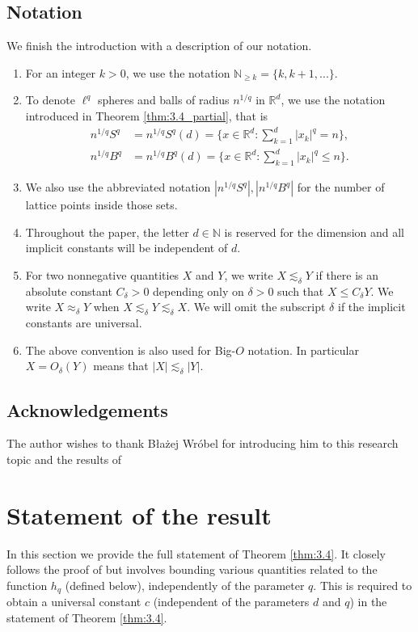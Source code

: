 \documentclass[a4paper,twoside, reqno]{amsart}
\numberwithin{equation}{section}
\theoremstyle{definition}%
\theoremstyle{definition}
\theoremstyle{definition}%
\theoremstyle{definition}
\newcommand{\N}{\mathbb{N}}
\newcommand{\R}{\mathbb{R}}
\begin{document}
\subsection{Notation}
\label{ssec:not}
We finish the introduction with a description of our notation. 

\begin{enumerate}
\item For an integer $k>0$, we use the notation $\N_{\geq k}= \{k,k+1,... \}$.
\item To denote $\ell^q$ spheres and balls of radius $n^{1/q}$ in $\R^d$, we use the notation introduced in Theorem \ref{thm:3.4_partial}, that is
\begin{align*}
n^{1/q}S^q &= n^{1/q}S^q(d) = \{x\in\R^d : \sum_{k=1}^d |x_k|^q = n\}, \\
n^{1/q}B^q &= n^{1/q}B^q(d) = \{x\in\R^d : \sum_{k=1}^d |x_k|^q \leq n\}.
\end{align*}
 \item We also use the abbreviated notation $|n^{1/q}S^q|, |n^{1/q}B^q|$ for the number of lattice points inside those sets.
\item Throughout the paper, the letter $d\in \N$ is reserved for the dimension and all implicit constants will be
independent of $d$.  
\item For two nonnegative quantities $X$ and $Y$,
we write $X \lesssim_{\delta} Y$ if there is an absolute constant
$C_{\delta}>0$ depending only on $\delta>0$ such that $X\le C_{\delta}Y$.
We  write $X \approx_{\delta} Y$ when
$X \lesssim_{\delta} Y\lesssim_{\delta} X$. We will omit the subscript
$\delta$ if the implicit constants are universal.
\item The above convention is also used for Big-$O$ notation. In particular $X=O_{\delta}(Y)$ means that $|X|\lesssim_{\delta} |Y|.$
\end{enumerate}

\subsection*{Acknowledgements}
The author wishes to thank Błażej Wróbel for introducing him to this research topic and the results of \cite{l2_balls}

\section{Statement of the result}
\label{sec:3}
In this section we provide the full statement  of Theorem \ref{thm:3.4}. It closely follows the proof of \cite[Theorem 3.4]{l2_balls} but involves bounding various quantities related to the function $h_q$ (defined below), independently of the parameter $q$.
This is required to obtain a universal constant $c$ (independent of the parameters $d$ and $q$) in the statement of Theorem \ref{thm:3.4}.
\end{document}
